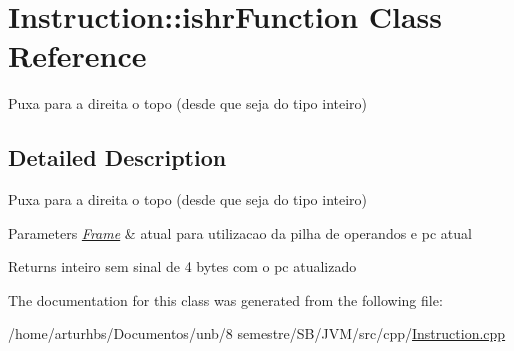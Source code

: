 \hypertarget{classInstruction_1_1ishrFunction}{}\section{Instruction\+:\+:ishr\+Function Class Reference}
\label{classInstruction_1_1ishrFunction}


Puxa para a direita o topo (desde que seja do tipo inteiro)  




\subsection{Detailed Description}
Puxa para a direita o topo (desde que seja do tipo inteiro) 


\begin{DoxyParams}{Parameters}
{\em \hyperlink{classFrame}{Frame}} & atual para utilizacao da pilha de operandos e pc atual \\
\hline
\end{DoxyParams}
\begin{DoxyReturn}{Returns}
inteiro sem sinal de 4 bytes com o pc atualizado 
\end{DoxyReturn}


The documentation for this class was generated from the following file\+:\begin{DoxyCompactItemize}
\item 
/home/arturhbs/\+Documentos/unb/8 semestre/\+S\+B/\+J\+V\+M/src/cpp/\hyperlink{Instruction_8cpp}{Instruction.\+cpp}\end{DoxyCompactItemize}
